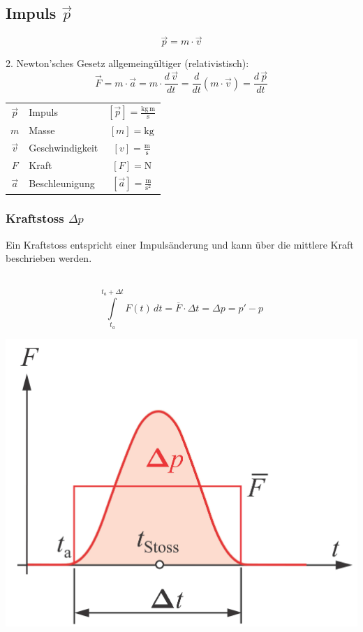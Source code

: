 	
	
	
	\subsection{Impuls $\vec{p}$}
	
	$$ \boxed{ \vec{p} = m \cdot \vec{v} }$$ 
	
	2. Newton'sches Gesetz allgemeingültiger (relativistisch): \\
	
	$$ \boxed{ \vec{F} = m \cdot \vec{a} = m \cdot \frac{d \, \vec{v}}{dt} = \frac{d}{dt} (m \cdot \vec{v}) = \frac{d \, \vec{p}}{dt} } $$ 
	
	
	\begin{tabular}{c l c}
	$\vec{p}$ & Impuls & $[\vec{p}] = \mathrm{\frac{kg  \, m}{s}}$ \\
	$m$ & Masse & $[m] = \mathrm{kg}$ \\
	$\vec{v}$ & Geschwindigkeit & $[v] = \mathrm{\frac{m}{s}}$ \\
	$F$ & Kraft & $[F] = \mathrm{N}$ \\
	$\vec{a}$ & Beschleunigung & $[\vec{a}] = \mathrm{\frac{m}{s^2}}$ \\
	\end{tabular}
	
	
	\subsubsection{Kraftstoss $\Delta p$}
	Ein Kraftstoss entspricht einer Impulsänderung und kann über die mittlere Kraft beschrieben werden. \\
	\\
	\begin{minipage}{0.55\linewidth}
	$$ \boxed{ \int \limits_{t_a}^{t_a + \Delta t}  F(t) \, dt = \overline{F} \cdot \Delta t = \Delta p = p' - p } $$ 	
	\end{minipage}
	\hfill
	\begin{minipage}{0.42\linewidth}
	\includegraphics[width=0.8\linewidth]{Bilder/impuls} \\
	\end{minipage}
	
